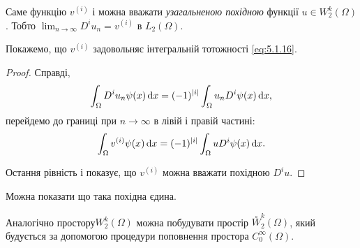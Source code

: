 \begin{definition}
    Саме функцію $v^{(i)}$ і можна вважати \emph{узагальненою похідною} функції $u \in W_2^k(\Omega)$. Тобто $\lim_{n \to \infty} D^i u_n = v^{(i)}$ в $L_2(\Omega)$. 
\end{definition}

\begin{proposition}
    Покажемо, що $v^{(i)}$ задовольняє інтегральній тотожності \eqref{eq:5.1.16}.
\end{proposition}

\begin{proof}
    Справді,
    \begin{equation*}
        \int_\Omega D^i u_n \psi(x) \mathop{}\!\mathrm{d} x = (-1)^{|i|} \int_\Omega u_n D^i \psi(x) \mathop{}\!\mathrm{d} x,
    \end{equation*}
    перейдемо до границі при $n \to \infty$ в лівій і правій частині:
    \begin{equation}
        \label{eq:5.1.17}
        \int_\Omega v^{(i)} \psi(x) \mathop{}\!\mathrm{d} x = (-1)^{|i|} \int_\Omega u D^i \psi(x) \mathop{}\!\mathrm{d} x.
    \end{equation}

    Остання рівність і показує, що $v^{(i)}$ можна вважати похідною $D^i u$. 
\end{proof}

\begin{remark}
    Можна показати що така похідна єдина.
\end{remark}

\begin{remark}
    Аналогічно простору$W_2^k(\Omega)$ можна побудувати простір $\overset{\circ}{W}_2^k(\Omega)$, який будується за допомогою процедури поповнення простора $C_0^\infty(\Omega)$.
\end{remark}



